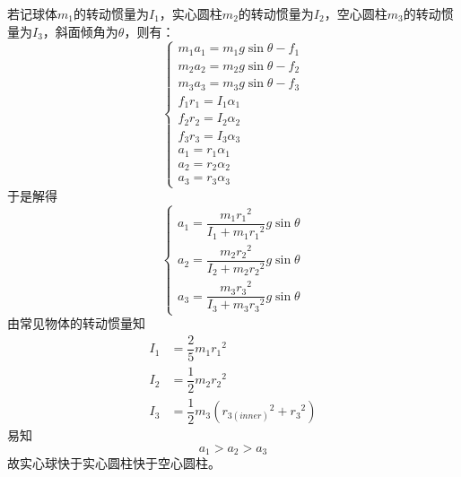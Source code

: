 \begin{solution}
    若记球体$m_1$的转动惯量为$I_1$，实心圆柱$m_2$的转动惯量为$I_2$，空心圆柱$m_3$的转动惯量为$I_3$，斜面倾角为$\theta$，则有：
    \[\left\{
        \begin{array}{l}
            m_1a_1=m_1g\sin\theta-f_1 \\
            m_2a_2=m_2g\sin\theta-f_2 \\
            m_3a_3=m_3g\sin\theta-f_3 \\
            f_1r_1=I_1\alpha_1        \\
            f_2r_2=I_2\alpha_2        \\
            f_3r_3=I_3\alpha_3        \\
            a_1=r_1\alpha_1           \\
            a_2=r_2\alpha_2           \\
            a_3=r_3\alpha_3
        \end{array}
        \right.\]
    于是解得
    \[\left\{
        \begin{array}{l}
            a_1=\dfrac{m_1r_1{}^2}{I_1+m_1r_1{}^2}g\sin\theta \\[2ex]
            a_2=\dfrac{m_2r_2{}^2}{I_2+m_2r_2{}^2}g\sin\theta \\[2ex]
            a_3=\dfrac{m_3r_3{}^2}{I_3+m_3r_3{}^2}g\sin\theta
        \end{array}
        \right.\]
    由常见物体的转动惯量知
    \begin{align*}
        I_1 & =\dfrac{2}{5}m_1r_1{}^2                    \\
        I_2 & =\dfrac{1}{2}m_2r_2{}^2                    \\
        I_3 & =\dfrac{1}{2}m_3(r_{3(inner)}{}^2+r_3{}^2)
    \end{align*}
    易知
    \[a_1>a_2>a_3\]
    故实心球快于实心圆柱快于空心圆柱。
\end{solution}


